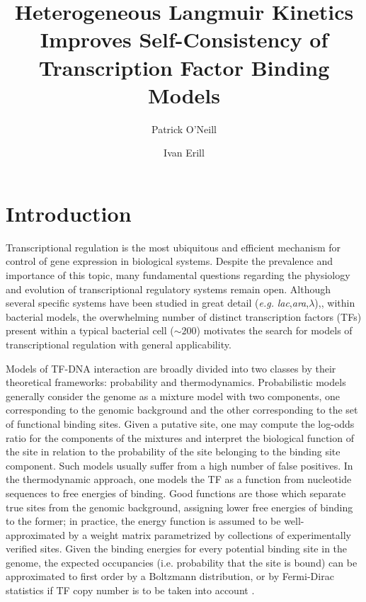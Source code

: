 \documentclass{article}
\begin{document}
\title{Heterogeneous Langmuir Kinetics Improves Self-Consistency of Transcription Factor Binding Models}
\author[1]{Patrick O'Neill}
\author[1]{Ivan Erill}
\maketitle{}
\section{Introduction}

\doublespacing Transcriptional regulation is the most ubiquitous and
efficient mechanism for control of gene expression in biological
systems.  Despite the prevalence and importance of this topic, many
fundamental questions regarding the physiology and evolution of
transcriptional regulatory systems remain open.  Although several
specific systems have been studied in great detail
(\textit{e.g.} \textit{lac},\textit{ara},$\lambda$)\cite{riggs70},\cite{hamilton88},\cite{ptashne67}
within bacterial models, the overwhelming number of distinct
transcription factors (TFs) present within a typical bacterial cell
($\sim 200$) motivates the search for models of transcriptional
regulation with general applicability.

Models of TF-DNA interaction are broadly divided into two classes by
their theoretical frameworks: probability and thermodynamics.
Probabilistic models generally consider the genome as a mixture model
with two components, one corresponding to the genomic background and
the other corresponding to the set of functional binding sites.  Given
a putative site, one may compute the log-odds ratio for the components
of the mixtures and interpret the biological function of the site in
relation to the probability of the site belonging to the binding site
component.  Such models usually suffer from a high number of false
positives\cite{erill09}.  In the thermodynamic approach, one models
the TF as a function from nucleotide sequences to free energies of
binding.  Good functions are those which separate true sites from the
genomic background, assigning lower free energies of binding to the
former; in practice, the energy function is assumed to be
well-approximated by a weight matrix parametrized by collections of
experimentally verified sites.  Given the binding energies for every
potential binding site in the genome, the expected occupancies
(i.e. probability that the site is bound) can be approximated to first
order by a Boltzmann distribution, or by Fermi-Dirac statistics if TF
copy number is to be taken into account \cite{gerland02}.
\end{document}
